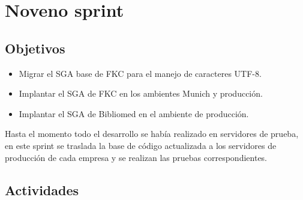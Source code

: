 \section{Noveno sprint} %
\label{sec:noveno_sprint}

\subsection{Objetivos}

\begin{itemize}
	\item Migrar el SGA base de FKC para el manejo de caracteres UTF-8.
	\item Implantar el SGA de FKC en los ambientes Munich y producción.
	\item Implantar el SGA de Bibliomed en el ambiente de producción.
\end{itemize}

Hasta el momento todo el desarrollo se había realizado en servidores de prueba, en este sprint se traslada la base de código actualizada a los servidores de producción de cada empresa y se realizan las pruebas correspondientes.

\subsection{Actividades} %
\label{sub:actividades9}

